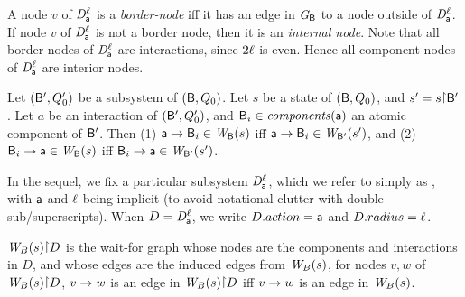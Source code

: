  \label{def:dsk.border-and internal}
A node $v$ of $\mathit{D}_{\mathsf{a}}^{\ell}$ is a \emph{border-node} iff it has an
edge in $\mathit{G}_{\mathsf{B}}$ to a node outside of $\mathit{D}_{\mathsf{a}}^{\ell}$.
If node $v$ of $\mathit{D}_{\mathsf{a}}^{\ell}$ is not a border node, then it is an \emph{internal node}.
\ed
Note that all border nodes of  $\mathit{D}_{\mathsf{a}}^{\ell}$ are interactions,
since $2\ell$ is even. Hence all component nodes of $\mathit{D}_{\mathsf{a}}^{\ell}$ are
interior nodes.



 \label{prop:edge-projection}
Let $(\mathsf{B}', Q'_0)$ be a subsystem of
$(\mathsf{B}, Q_0)$. Let $s$ be a state of $(\mathsf{B}, Q_0)$, and $s' = s \pj \B'$.
Let $a$ be an interaction of $(\mathsf{B}', Q'_0)$, and $\mathsf{B}_i \in \mathit{components}(\mathsf{a})$ an atomic component of $\mathsf{B}'$.
Then 
(1) $\mathsf{a} \rightarrow \mathsf{B}_i \in \mathit{W}_{\mathsf{B}}({s})$ iff $\mathsf{a} \rightarrow \mathsf{B}_i \in \mathit{W}_{\mathsf{B}'}({s'})$, and
(2) $\mathsf{B}_i \rightarrow \mathsf{a} \in \mathit{W}_{\mathsf{B}}({s})$ iff $\mathsf{B}_i \rightarrow \mathsf{a} \in \mathit{W}_{\mathsf{B}'}({s'})$.
\ep
{}

In the sequel, we fix a particular subsystem $\mathit{D}_{\mathsf{a}}^{\ell}$, which
we refer to simply as \DS, with $\mathsf{a}$ and $\ell$ being implicit (to
avoid notational clutter with double-sub/superscripts). 
When $D = \mathit{D}_{\mathsf{a}}^{\ell}$, we write $D.action = \mathsf{a}$ and
$D.radius = \ell$. 



 \label{defn:projWgraph}
$\wfg{B}{s} \pj \DS$ is the wait-for graph whose nodes are the
components and interactions in $D$, and whose edges are the induced
edges from $\mathit{W}_{B}({s})$, \ie for nodes $v, w$ of $\wfg{B}{s} \pj \DS$,
$v \rightarrow w$ is an edge in $\wfg{B}{s} \pj \DS$ iff $v \rightarrow w$ is an edge in $\mathit{W}_{B}({s})$.

